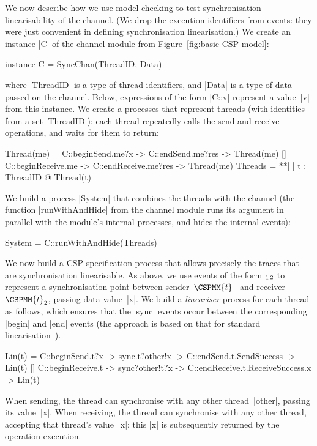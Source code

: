 We now describe how we use model checking to test synchronisation
linearisability of the channel.  (We drop the execution identifiers from
events: they were just convenient in defining synchronisation linearisation.)
We create an instance |C| of the channel module from
Figure~\ref{fig:basic-CSP-model}:  
\begin{cspm}
instance C = SyncChan(ThreadID, Data)
\end{cspm}
where |ThreadID| is a type of thread identifiers, and |Data| is a type of data
passed on the channel.
Below, expressions of the form |C::v|
represent a value~|v| from this instance.
%
We create a processes that represent threads (with identities
from a set |ThreadID|): each thread repeatedly calls the send and receive
operations,
and waits for them to return:
%
\begin{cspm}
Thread(me) = 
  C::beginSend.me?x -> C::endSend.me?res -> Thread(me)
  [] C::beginReceive.me -> C::endReceive.me?res -> Thread(me)
Threads = **||| t : ThreadID @ Thread(t)
\end{cspm}
%
We build a process |System| that combines the threads with the channel (the
function |runWithAndHide| from the channel module runs its argument in
parallel with the module's internal processes, and hides the internal events):
\begin{cspm}
System = C::runWithAndHide(Threads)
\end{cspm}

We now build a CSP specification process that allows precisely the traces that
are synchronisation linearisable.  As above, we use events of the form
$_1$$_2$ to represent a synchronisation point
between sender~$\CSPMM{t}\CSPcolour_1$ and receiver~$\CSPMM{t}\CSPcolour_2$, passing data
value~|x|.  We build a \emph{lineariser} process for each thread as follows,
which ensures that the |sync| events occur between the corresponding |begin|
and |end| events (the approach is based on that for standard
linearisation~\cite{gavin:lock-free-queue}).
%
\begin{cspm}
Lin(t) = 
  C::beginSend.t?x -> sync.t?other!x -> C::endSend.t.SendSuccess -> Lin(t)
  [] C::beginReceive.t -> sync?other!t?x -> C::endReceive.t.ReceiveSuccess.x -> Lin(t)
\end{cspm}
%
When sending, the thread can synchronise with any other thread~|other|,
passing its value~|x|.  When receiving, the thread can synchronise with any
other thread, accepting that thread's value~|x|; this |x| is subsequently
returned by the operation execution.

